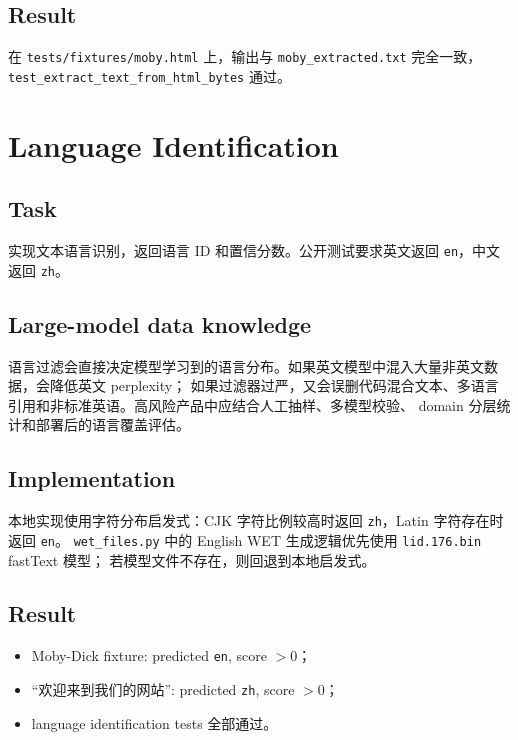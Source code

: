 \documentclass[UTF8,11pt]{ctexart}
\begin{document}
\subsection*{Result}

在 \texttt{tests/fixtures/moby.html} 上，输出与 \texttt{moby\_extracted.txt} 完全一致，
\texttt{test\_extract\_text\_from\_html\_bytes} 通过。

\section{Language Identification}

\subsection*{Task}

实现文本语言识别，返回语言 ID 和置信分数。公开测试要求英文返回 \texttt{en}，中文返回 \texttt{zh}。

\subsection*{Large-model data knowledge}

语言过滤会直接决定模型学习到的语言分布。如果英文模型中混入大量非英文数据，会降低英文 perplexity；
如果过滤器过严，又会误删代码混合文本、多语言引用和非标准英语。高风险产品中应结合人工抽样、多模型校验、
domain 分层统计和部署后的语言覆盖评估。

\subsection*{Implementation}

本地实现使用字符分布启发式：CJK 字符比例较高时返回 \texttt{zh}，Latin 字符存在时返回 \texttt{en}。
\texttt{wet\_files.py} 中的 English WET 生成逻辑优先使用 \texttt{lid.176.bin} fastText 模型；
若模型文件不存在，则回退到本地启发式。

\subsection*{Result}

\begin{itemize}
  \item Moby-Dick fixture: predicted \texttt{en}, score $>0$；
  \item ``欢迎来到我们的网站'': predicted \texttt{zh}, score $>0$；
  \item language identification tests 全部通过。
\end{itemize}
\end{document}
